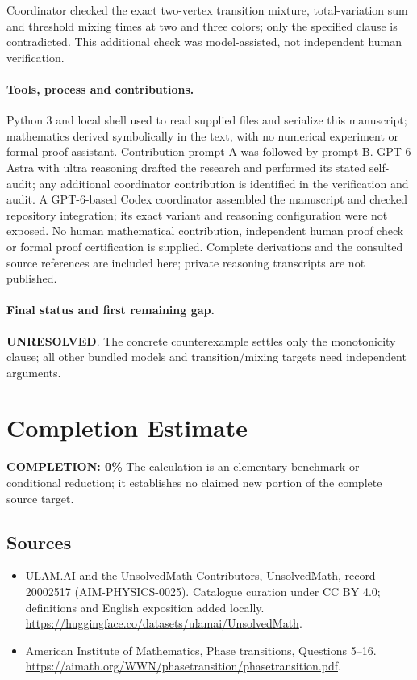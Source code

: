 \documentclass[11pt]{article}
\begin{document}
Coordinator checked the exact two-vertex transition mixture, total-variation sum and threshold mixing times at two and three colors; only the specified clause is contradicted. This additional check was model-assisted, not independent human verification.

\paragraph{Tools, process and contributions.}
Python 3 and local shell used to read supplied files and serialize this manuscript; mathematics derived symbolically in the text, with no numerical experiment or formal proof assistant. Contribution prompt A was followed by prompt B. GPT-6 Astra with ultra reasoning drafted the research and performed its stated self-audit; any additional coordinator contribution is identified in the verification and audit. A GPT-6-based Codex coordinator assembled the manuscript and checked repository integration; its exact variant and reasoning configuration were not exposed. No human mathematical contribution, independent human proof check or formal proof certification is supplied. Complete derivations and the consulted source references are included here; private reasoning transcripts are not published.

\paragraph{Final status and first remaining gap.}
\textbf{UNRESOLVED}. The concrete counterexample settles only the monotonicity clause; all other bundled models and transition/mixing targets need independent arguments.

\section{Completion Estimate}
\noindent\textbf{COMPLETION: 0\%}
The calculation is an elementary benchmark or conditional reduction; it establishes no claimed new portion of the complete source target.

\subsection{Sources}
\begin{itemize}
\item[\hypertarget{source:20002517:1}{S1}] ULAM.AI and the UnsolvedMath Contributors, UnsolvedMath, record 20002517 (AIM-PHYSICS-0025). Catalogue curation under CC BY 4.0; definitions and English exposition added locally.
\url{https://huggingface.co/datasets/ulamai/UnsolvedMath}.
\item[\hypertarget{source:20002517:2}{S2}] American Institute of Mathematics, Phase transitions, Questions 5–16.
\url{https://aimath.org/WWN/phasetransition/phasetransition.pdf}.
\end{itemize}
\label{end:20002517}
\end{document}
